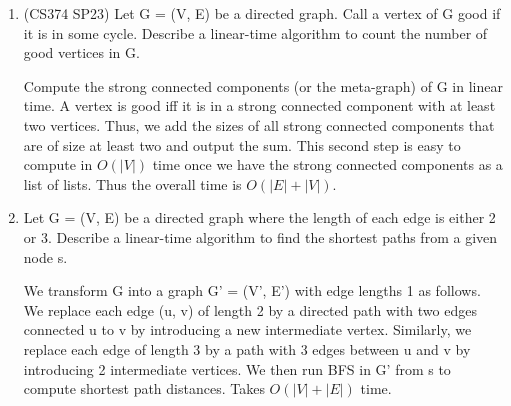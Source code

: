 \documentclass[fleqn]{article}
\begin{document}
\begin{enumerate}
    \item  (CS374 SP23) Let G = (V, E) be a directed graph. Call a vertex of G good if it is in some cycle. Describe a linear-time algorithm to count the number of good vertices in G.
    \begin{answer}
    Compute the strong connected components (or the meta-graph) of G in linear time. A vertex is good iff it is in a strong connected component with at least two vertices. Thus, we add the sizes of all strong connected components that are of size at least two and output the sum. This second step is easy to compute in $O(|V|)$ time once we have the strong connected components as a list of lists. Thus the overall time is $O(|E| + |V|)$.

    \end{answer}

    \item Let G = (V, E) be a directed graph where the length of each edge is either 2 or 3. Describe a linear-time algorithm to find the shortest paths from a given node s.
    \begin{answer}
    We transform G into a graph G' = (V', E') with edge lengths 1 as follows. We replace each edge (u, v) of length 2 by a directed path with two edges connected u to v by introducing a new intermediate vertex. Similarly, we replace each edge of length 3 by a path with 3 edges between u and v by introducing 2 intermediate vertices. We then run BFS in G' from s to compute shortest path distances. Takes $O(|V|+|E|)$ time.
    \end{answer}
    
    
\end{enumerate}
\end{document}
